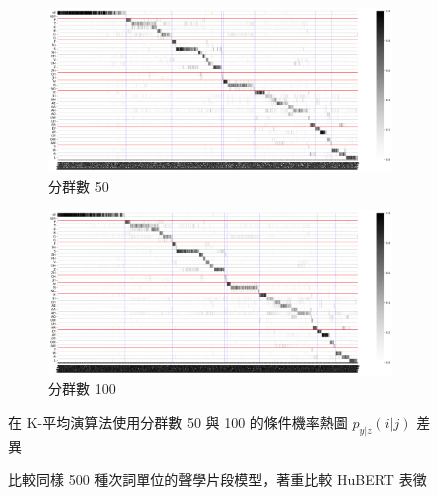 
{
    {
        \begin{figure}
             \centering
             \begin{subfigure}{\textwidth}
                 \centering
                 \includegraphics[width=1\linewidth]{figures/ch4figs/hub-u050-ap0500-givenunit-byphn.png}
                 \caption{分群數 50}
                 \label{fig:hub-u050-ap0500-givenunit-byphn--picked}
             \end{subfigure}
             \vfill
             \begin{subfigure}{\textwidth}
                 \centering
                 \includegraphics[width=1\linewidth]{figures/ch4figs/hub-u050-ap1000-givenunit-byphn.png}
                 \caption{分群數 100}
                 \label{fig:hub-u100-ap0500-givenunit-byphn--picked}
             \end{subfigure}
             \caption{比較同樣 500 種次詞單位的聲學片段模型，著重比較 HuBERT 表徵}
             在 K-平均演算法使用分群數 50 與 100 的條件機率熱圖 $p_{y|z}(i|j)$ 差異
             \label{fig:check-ap0500}
        \end{figure}
    }
}

